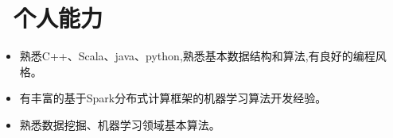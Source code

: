 \documentclass{resume}
\begin{document}





\section{\faCogs\ 个人能力}
\begin{itemize}[parsep=0.5ex]
  \item 熟悉C++、Scala、java、python,熟悉基本数据结构和算法,有良好的编程风格。
  \item 有丰富的基于Spark分布式计算框架的机器学习算法开发经验。
  \item 熟悉数据挖掘、机器学习领域基本算法。
\end{itemize}


%
%
\end{document}
